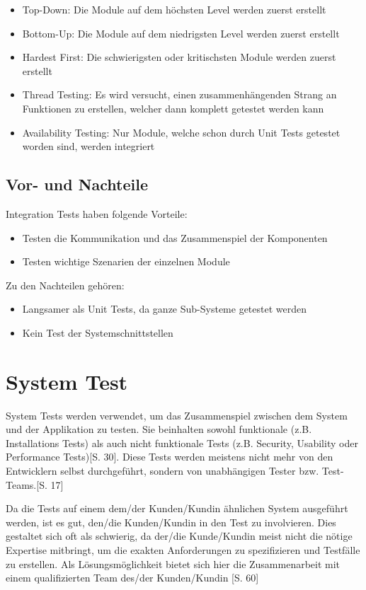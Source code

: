 \documentclass[a4paper,bibtotoc,oneside]{scrbook}
\begin{document}
\begin{itemize}
  \item Top-Down: Die Module auf dem höchsten Level werden zuerst erstellt
  \item Bottom-Up: Die Module auf dem niedrigsten Level werden zuerst erstellt
  \item Hardest First: Die schwierigsten oder kritischsten Module werden zuerst erstellt
  \item Thread Testing: Es wird versucht, einen zusammenhängenden Strang an Funktionen zu erstellen, welcher dann komplett getestet werden kann
  \item Availability Testing: Nur Module, welche schon durch Unit Tests getestet worden sind, werden integriert
\end{itemize}

\section{Vor- und Nachteile}
Integration Tests haben folgende Vorteile:

\begin{itemize}
  \item Testen die Kommunikation und das Zusammenspiel der Komponenten
  \item Testen wichtige Szenarien der einzelnen Module
\end{itemize}

Zu den Nachteilen gehören:

\begin{itemize}
  \item Langsamer als Unit Tests, da ganze Sub-Systeme getestet werden
  \item Kein Test der Systemschnittstellen
\end{itemize}


\chapter{System Test}
System Tests werden verwendet, um das Zusammenspiel zwischen dem System und der Applikation zu testen. Sie beinhalten sowohl funktionale (z.B. Installations Tests) als auch nicht funktionale Tests (z.B. Security, Usability oder Performance Tests)\cite{betrieb}[S. 30]. Diese Tests \glqq werden meistens nicht mehr von den Entwicklern selbst durchgeführt, sondern von unabhängigen Tester bzw. Test-Teams.\grqq\cite{eval_regression}[S. 17]

Da die Tests auf einem dem/der Kunden/Kundin ähnlichen System ausgeführt werden, ist es gut, den/die Kunden/Kundin in den Test zu involvieren. Dies gestaltet sich oft als schwierig, da der/die Kunde/Kundin meist nicht die nötige Expertise mitbringt, um die exakten Anforderungen zu spezifizieren und Testfälle zu erstellen. Als Lösungsmöglichkeit bietet sich hier die Zusammenarbeit mit einem qualifizierten Team des/der Kunden/Kundin \cite{test_large_systems}[S. 60]
\end{document}
